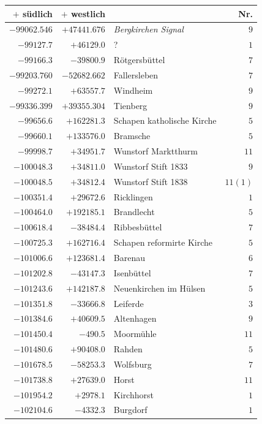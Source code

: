 \clearpage{}%
\begin{center}\begingroup\fontsize{8}{9}\selectfont
\setlength{\tabcolsep}{4pt}
\begin{tabular}{r|r|p{170pt}|r}\hline
\(+\) südlich&\(+\) westlich&&Nr.\\\hline
\(-99062.546\)&\(+47441.676\)&\textit{Bergkirchen Signal}&\(9\)\\
\(-99127.7\)&\(+46129.0\)&?&\(1\)\\
\(-99166.3\)&\(-39800.9\)&Rötgersbüttel&\(7\)\\
\(-99203.760\)&\(-52682.662\)&Fallersleben&\(7\)\\
\(-99272.1\)&\(+63557.7\)&Windheim&\(9\)\\
\(-99336.399\)&\(+39355.304\)&Tienberg&\(9\)\\
\(-99656.6\)&\(+162281.3\)&Schapen katholische Kirche&\(5\)\\
\(-99660.1\)&\(+133576.0\)&Bramsche&\(5\)\\
\(-99998.7\)&\(+34951.7\)&Wunstorf Marktthurm&\(11\)\\
\(-100048.3\)&\(+34811.0\)&Wunstorf Stift 1833&\(9\)\\
\(-100048.5\)&\(+34812.4\)&Wunstorf Stift 1838&\(11 (1)\)\\
\(-100351.4\)&\(+29672.6\)&Ricklingen&\(1\)\\
\(-100464.0\)&\(+192185.1\)&Brandlecht&\(5\)\\
\(-100618.4\)&\(-38484.4\)&Ribbesbüttel&\(7\)\\
\(-100725.3\)&\(+162716.4\)&Schapen reformirte Kirche&\(5\)\\
\(-101006.6\)&\(+123681.4\)&Barenau&\(6\)\\
\(-101202.8\)&\(-43147.3\)&Isenbüttel&\(7\)\\
\(-101243.6\)&\(+142187.8\)&Neuenkirchen im Hülsen&\(5\)\\
\(-101351.8\)&\(-33666.8\)&Leiferde&\(3\)\\
\(-101384.6\)&\(+40609.5\)&Altenhagen&\(9\)\\
\(-101450.4\)&\(-490.5\)&Moormühle&\(11\)\\
\(-101480.6\)&\(+90408.0\)&Rahden&\(5\)\\
\(-101678.5\)&\(-58253.3\)&Wolfsburg&\(7\)\\
\(-101738.8\)&\(+27639.0\)&Horst&\(11\)\\
\(-101954.2\)&\(+2978.1\)&Kirchhorst&\(1\)\\
\(-102104.6\)&\(-4332.3\)&Burgdorf&\(1\)\\

\end{tabular}
\end{center}
